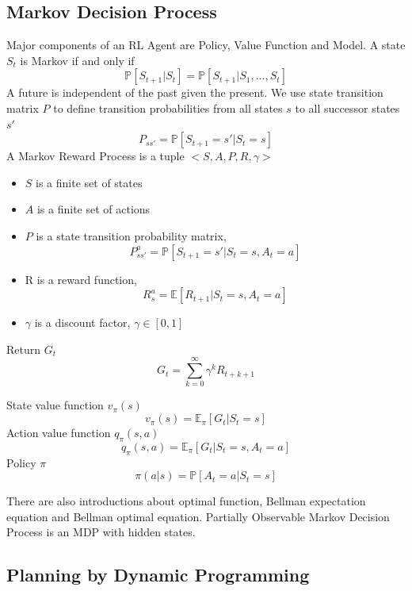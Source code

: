 \documentclass[10pt,twocolumn,letterpaper]{article}
\begin{document}
\subsection{Markov Decision Process}

Major components of an RL Agent are Policy, Value Function and Model. A state $S_t$ is Markov if and only if
\begin{equation}
\mathbb{P}[S_{t+1}|S_t] = \mathbb{P}[S_{t+1}|S_1, ... , S_t]
\end{equation}
A future is independent of the past given the present. We use state transition matrix $P$ to define transition probabilities from all states $s$ to all successor states $s'$
\begin{equation}
P_{ss'}=\mathbb{P}[S_{t+1}=s'|S_t=s]
\end{equation}
A Markov Reward Process is a tuple $<S, A, P, R, \gamma>$
\begin{itemize}
	\item $S$ is a finite set of states
	\item $A$ is a finite set of actions
	\item $P$ is a state transition probability matrix,
		  $$P_{ss'}^{a} = \mathbb{P}[S_{t+1} = s'| S_t = s, A_t = a]$$
	\item R is a reward function, $$R_s^a = \mathbb{E}[R_{t+1}|S_t=s, A_t = a]$$
	\item $\gamma$ is a discount factor, $\gamma \in  [0, 1]$
\end{itemize}

Return $G_t$ $$G_t=\sum_{k=0}^{\infty} \gamma^k R_{t+k+1}$$

State value function $v_\pi (s)$
$$v_\pi (s) = \mathbb{E}_\pi [G_t|S_t = s]$$
Action value function $q_\pi (s, a)$
$$q_\pi (s, a) = \mathbb{E}_\pi [G_t|S_t = s, A_t = a]$$
Policy $\pi$ $$\pi (a|s) = \mathbb{P}[A_t = a|S_t=s]$$

There are also introductions about optimal function, Bellman expectation equation and Bellman optimal equation. Partially Observable Markov Decision Process is an MDP with hidden states.
\subsection{Planning by Dynamic Programming}
\end{document}
